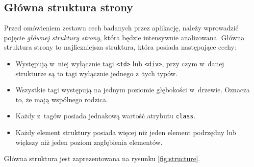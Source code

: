 \documentclass[a4paper,11pt]{article}
\begin{document}


\subsection{Główna struktura strony}
\label{sec:main_structure}

Przed omówieniem zestawu cech badanych przez aplikację, należy wprowadzić pojęcie \emph{głównej struktury strony}, która będzie intensywnie analizowana. Główna struktura strony to najliczniejsza struktura, która posiada następujące cechy:

\begin{itemize}
    \item Występują w~niej wyłącznie tagi \verb+<td>+ lub \verb+<div>+, przy czym w~danej strukturze są to tagi wyłącznie jednego z~tych typów.
    \item Wszystkie tagi występują na jednym poziomie głębokości w~drzewie. Oznacza to, że mają wspólnego rodzica.
    \item Każdy z~tagów posiada jednakową wartość atrybutu \verb+class+.
    \item Każdy element struktury posiada więcej niż jeden element podrzędny lub większy niż jeden poziom zagłębienia elementów.
\end{itemize}

Główna struktura jest zaprezentowana na rysunku \ref{fig:structure}.
\end{document}
